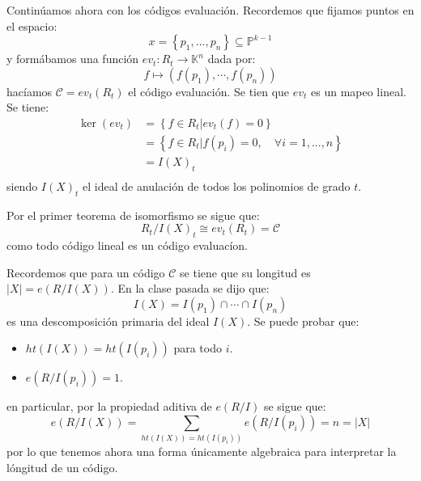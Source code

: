 \documentclass[12pt]{report}
\newcounter{it}
\theoremstyle{largebreak}
\newcommand\abs[1]{\ensuremath{\left|#1\right|}}
\newcommand\cf[3]{\ensuremath{#1:#2\rightarrow#3}}
\begin{document}
    Continúamos ahora con los códigos evaluación. Recordemos que fijamos puntos en el espacio:
    \begin{equation*}
        x=\left\{p_1,...,p_n \right\}\subseteq\mathbb{P}^{ k-1}
    \end{equation*}
    y formábamos una función $\cf{ev_t}{R_t}{\mathbb{K}^n}$ dada por:
    \begin{equation*}
        f\mapsto(f(p_1),\cdots,f(p_n))
    \end{equation*}
    hacíamos $\mathcal{C}=ev_t(R_t)$ el código evaluación. Se tien que $ev_t$ es un mapeo lineal. Se tiene:
    \begin{equation*}
        \begin{split}
            \ker(ev_t)&=\left\{f\in R_t\Big|ev_t(f)=0 \right\}\\
            &=\left\{f\in R_t\Big|f(p_i)=0,\quad\forall i=1,...,n \right\}\\
            &=I(X)_t\\
        \end{split}
    \end{equation*}
    siendo $I(X)_t$ el ideal de anulación de todos los polinomios de grado $t$.

    Por el primer teorema de isomorfismo se sigue que:
    \begin{equation*}
        R_t/I(X)_t\cong ev_t(R_t)=\mathcal{C}
    \end{equation*}
    como todo código lineal es un código evaluacíon.

    Recordemos que para un código $\mathcal{C}$ se tiene que su longitud es $\abs{X}=e(R/I(X))$. En la clase pasada se dijo que:
    \begin{equation*}
        I(X)=I(p_1)\cap\cdots\cap I(p_n)
    \end{equation*}
    es una descomposición primaria del ideal $I(X)$. Se puede probar que:
    \begin{itemize}
        \item $ht(I(X))=ht(I(p_i))$ para todo $i$.
        \item $e(R/I(p_i))=1$.
    \end{itemize}
    en particular, por la propiedad aditiva de $e(R/I)$ se sigue que:
    \begin{equation*}
        e(R/I(X))=\sum_{ ht(I(X))=ht(I(p_i))} e(R/I(p_i))=n=\abs{X}
    \end{equation*}
    por lo que tenemos ahora una forma únicamente algebraica para interpretar la lóngitud de un código.
\end{document}
